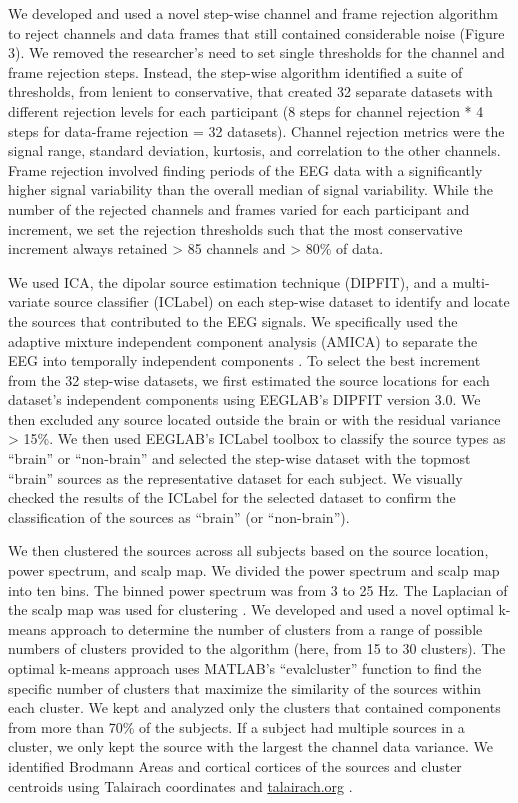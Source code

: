 \documentclass[shortpaper,twoside,web]{ieeecolor}
\begin{document}
We developed and used a novel step-wise channel and frame rejection algorithm to reject channels and data frames that still contained considerable noise (Figure 3). We removed the researcher's need to set single thresholds for the channel and frame rejection steps. Instead, the step-wise algorithm identified a suite of thresholds, from lenient to conservative, that created 32 separate datasets with different rejection levels for each participant (8 steps for channel rejection * 4 steps for data-frame rejection = 32 datasets). Channel rejection metrics were the signal range, standard deviation, kurtosis, and correlation to the other channels. Frame rejection involved finding periods of the EEG data with a significantly higher signal variability than the overall median of signal variability. While the number of the rejected channels and frames varied for each participant and increment, we set the rejection thresholds such that the most conservative increment always retained > 85 channels and > 80\% of data.

We used ICA, the dipolar source estimation technique (DIPFIT), and a multi-variate source classifier (ICLabel) on each step-wise dataset to identify and locate the sources that contributed to the EEG signals. We specifically used the adaptive mixture independent component analysis (AMICA) to separate the EEG into temporally independent components \cite{Palmer2008-jx}. To select the best increment from the 32 step-wise datasets, we first estimated the source locations for each dataset's independent components using EEGLAB’s DIPFIT version 3.0. We then excluded any source located outside the brain or with the residual variance > 15\%. We then used EEGLAB’s ICLabel toolbox to classify the source types as “brain” or “non-brain” \cite{Pion-Tonachini2017-ez} and selected the step-wise dataset with the topmost “brain” sources as the representative dataset for each subject. We visually checked the results of the ICLabel for the selected dataset to confirm the classification of the sources as “brain” (or “non-brain”).

We then clustered the sources across all subjects based on the source location, power spectrum, and scalp map. We divided the power spectrum and scalp map into ten bins. The binned power spectrum was from 3 to 25 Hz. The Laplacian of the scalp map was used for clustering \cite{Hjorth1975-ea}. We developed and used a novel optimal k-means approach to determine the number of clusters from a range of possible numbers of clusters provided to the algorithm (here, from 15 to 30 clusters). The optimal k-means approach uses MATLAB’s “evalcluster” function to find the specific number of clusters that maximize the similarity of the sources within each cluster. We kept and analyzed only the clusters that contained components from more than 70\% of the subjects. If a subject had multiple sources in a cluster, we only kept the source with the largest the channel data variance. We identified Brodmann Areas and cortical cortices of the sources and cluster centroids using Talairach coordinates and \href{http://talairach.org/}{talairach.org} \cite{Lancaster2000-aj,Shirazi2019-im}.
\end{document}
